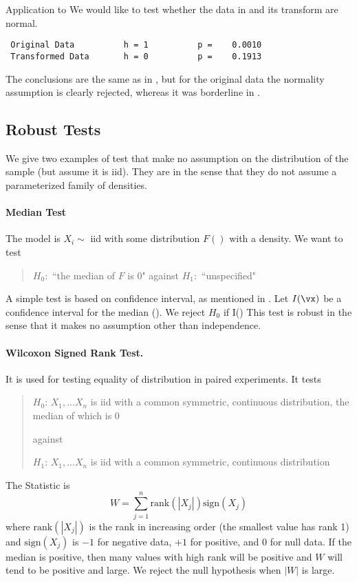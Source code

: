  \begin{ex}{Application to }
 We would like to test whether the data in  and its
transform are normal. {\footnotesize
 \begin{verbatim}
 Original Data          h = 1          p =    0.0010
 Transformed Data       h = 0          p =    0.1913
 \end{verbatim}
 }

The conclusions are the same as in
, but for the original data
the normality assumption is clearly rejected,
whereas it was borderline in .
\end{ex}


\subsection{Robust Tests}
 We give two examples of test that make
no assumption on the distribution of the sample (but assume it is
iid). They are  in the sense that they do not
assume a parameterized family of densities.


\paragraph{Median Test}
The model is $X_i \sim$ iid with some distribution $F()$ with a
density. We want to test
\begin{quote}
$H_0$:~``the median of $F$ is $0$" against $H_1$:~``unspecified"
\end{quote}
A simple test is based on confidence interval, as mentioned in
. Let $I({\vx})$ be a confidence interval for
the median (). We reject $H_0$ if
  \nin I({\vx})
 \ee
This test is robust in the sense that it makes no assumption other
than independence.

\paragraph{Wilcoxon Signed Rank Test.} It is used for testing
equality of distribution in paired experiments. It tests
 \begin{quote}
 $H_0$: $X_1,...X_n$ is iid with a common symmetric, continuous
 distribution, the median
 of which is 0

 against

 $H_1$: $X_1,...X_n$ is iid with a common symmetric, continuous
 distribution
 \end{quote}
The  Statistic is
$$
W=\sum_{j=1}^n \mbox{rank}(|X_j|) \mbox{sign}(X_j)
$$
where $\mbox{rank}(|X_j|)$ is the rank in increasing order
(the smallest value has rank 1) and $\mbox{sign}(X_j)$ is $-1$
for negative data, $+1$ for positive, and $0$ for null data.
If the median is positive, then many values with high rank
will be positive and $W$ will tend to be positive and large.
We reject the null hypothesis when $|W|$ is large.

